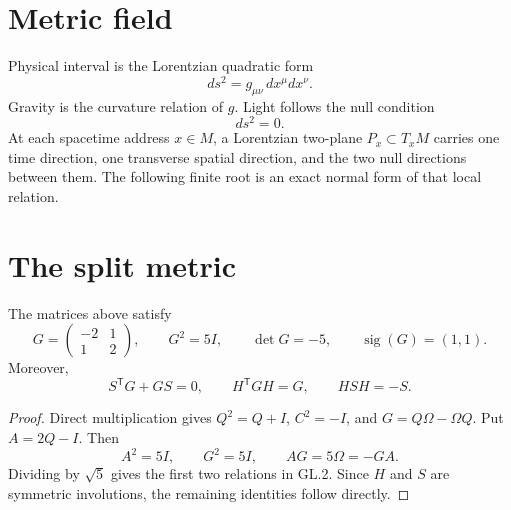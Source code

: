 \documentclass[10pt]{article}
\begin{document}

\begin{abstract}
Gravity measures interval. Light propagates along the null relation of that
interval. A recurrence matrix and an oriented area form generate a symmetric
split metric with two fixed null directions. Its metric flow is a Lorentzian
boost and its mirror reverses that boost. Every chosen Lorentzian two-plane of
spacetime has this root as an explicit normal form. Einstein curvature and
Maxwell curvature then describe the gravitational and electromagnetic fields
on the spacetime carrier. The resulting equations relate metric, null motion,
field strength, clock difference, and measured occurrence at one address.
\end{abstract}

\section{Metric field}

Physical interval is the Lorentzian quadratic form
\[
ds^2=g_{\mu\nu}\,dx^\mu dx^\nu.
\tag{GL.0}
\]
Gravity is the curvature relation of $g$. Light follows the null condition
\[
ds^2=0.
\tag{GL.0a}
\]
At each spacetime address $x\in M$, a Lorentzian two-plane
$P_x\subset T_xM$ carries one time direction, one transverse spatial
direction, and the two null directions between them. The following finite
root is an exact normal form of that local relation.

\section{The split metric}

\sharedroot

\begin{theorem}
The matrices above satisfy
\[
G=\begin{pmatrix}-2&1\\1&2\end{pmatrix},\qquad
G^2=5I,\qquad \det G=-5,\qquad
\operatorname{sig}(G)=(1,1).
\tag{GL.1}
\]
Moreover,
\[
S^{\mathsf T}G+GS=0,\qquad
H^{\mathsf T}GH=G,\qquad
HSH=-S.
\tag{GL.2}
\]
\end{theorem}

\begin{proof}
Direct multiplication gives $Q^2=Q+I$, $C^2=-I$, and
$G=Q\Omega-\Omega Q$. Put $A=2Q-I$. Then
\[
A^2=5I,\qquad G^2=5I,\qquad AG=5\Omega=-GA.
\]
Dividing by $\sqrt5$ gives the first two relations in GL.2. Since $H$ and
$S$ are symmetric involutions, the remaining identities follow directly.
\end{proof}
\end{document}

